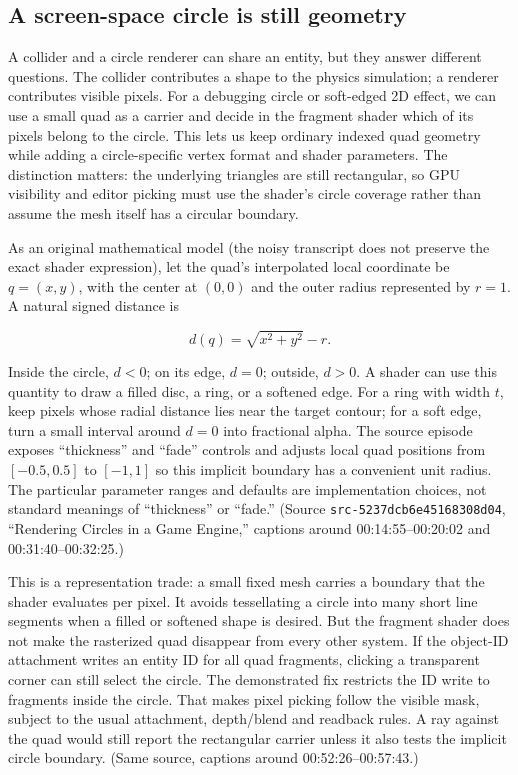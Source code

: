 \subsection{A screen-space circle is still geometry}\label{06-engine-ii-ch040-a-screen-space-circle-is-still-geometry}

A collider and a circle renderer can share an entity, but they answer different questions. The collider contributes a shape to the physics simulation; a renderer contributes visible pixels. For a debugging circle or soft-edged 2D effect, we can use a small quad as a carrier and decide in the fragment shader which of its pixels belong to the circle. This lets us keep ordinary indexed quad geometry while adding a circle-specific vertex format and shader parameters. The distinction matters: the underlying triangles are still rectangular, so GPU visibility and editor picking must use the shader's circle coverage rather than assume the mesh itself has a circular boundary.

As an original mathematical model (the noisy transcript does not preserve the exact shader expression), let the quad's interpolated local coordinate be \(q=(x,y)\), with the center at \((0,0)\) and the outer radius represented by \(r=1\). A natural signed distance is

\[
d(q)=\sqrt{x^2+y^2}-r.
\]

Inside the circle, \(d<0\); on its edge, \(d=0\); outside, \(d>0\). A shader can use this quantity to draw a filled disc, a ring, or a softened edge. For a ring with width \(t\), keep pixels whose radial distance lies near the target contour; for a soft edge, turn a small interval around \(d=0\) into fractional alpha. The source episode exposes ``thickness'' and ``fade'' controls and adjusts local quad positions from \([-0.5,0.5]\) to \([-1,1]\) so this implicit boundary has a convenient unit radius. The particular parameter ranges and defaults are implementation choices, not standard meanings of ``thickness'' or ``fade.'' (Source \texttt{src-5237dcb6e45168308d04}, ``Rendering Circles in a Game Engine,'' captions around 00:14:55--00:20:02 and 00:31:40--00:32:25.)

This is a representation trade: a small fixed mesh carries a boundary that the shader evaluates per pixel. It avoids tessellating a circle into many short line segments when a filled or softened shape is desired. But the fragment shader does not make the rasterized quad disappear from every other system. If the object-ID attachment writes an entity ID for all quad fragments, clicking a transparent corner can still select the circle. The demonstrated fix restricts the ID write to fragments inside the circle. That makes pixel picking follow the visible mask, subject to the usual attachment, depth/blend and readback rules. A ray against the quad would still report the rectangular carrier unless it also tests the implicit circle boundary. (Same source, captions around 00:52:26--00:57:43.)

